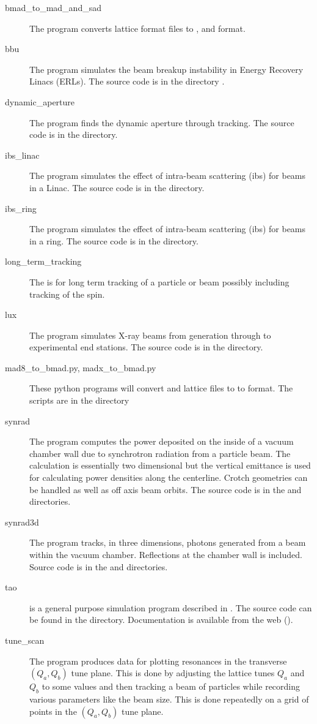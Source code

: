 \documentclass{hitec}     %
\begin{document}
  \begin{description}
%
  \item[bmad_to_mad_and_sad] \Newline
The  program converts \bmad lattice format files to ,  and
 format.
%
  \item[bbu] \Newline
The  program simulates the beam breakup instability in Energy Recovery Linacs (ERLs). The
source code is in the directory .
%
  \item[dynamic_aperture] \Newline
The  program finds the dynamic aperture through tracking. The source code is in
the  directory.
%
  \item[ibs_linac] \Newline
The  program simulates the effect of intra-beam scattering (ibs) for beams
in a Linac. The source code is in the  directory.
%
  \item[ibs_ring] \Newline
The  program simulates the effect of intra-beam scattering (ibs) for beams
in a ring. The source code is in the  directory.
%
  \item[long_term_tracking] \Newline
The  is for long term tracking of a particle or beam possibly
including tracking of the spin.
%
  \item[lux] \Newline
The  program simulates X-ray beams from generation through to experimental end stations.
The source code is in the  directory.
%
  \item[mad8_to_bmad.py, madx_to_bmad.py] \Newline
These python programs will convert  and  lattice files to to \bmad format. The
scripts are in the  directory
%
  \item[synrad] \Newline
The  program computes the power deposited on the inside of a vacuum chamber
wall due to synchrotron radiation from a particle beam. The calculation is essentially two
dimensional but the vertical emittance is used for calculating power densities along the
centerline. Crotch geometries can be handled as well as off axis beam orbits. The source code 
is in the  and  directories. 
%
  \item[synrad3d] \Newline
The  program tracks, in three dimensions, photons generated from a beam
within the vacuum chamber. Reflections at the chamber wall is included. Source code is
in the  and  directories.
%
  \item[tao] \Newline
\tao is a general purpose simulation program described in . The source code can be
found in the  directory. Documentation is available from the web ().
%
  \item[tune_scan] \Newline
The  program produces data for plotting resonances in the transverse $(Q_a, Q_b)$ tune
plane.  This is done by adjusting the lattice tunes $Q_a$ and $Q_b$ to some values and then tracking
a beam of particles while recording various parameters like the beam size. This is done repeatedly
on a grid of points in the $(Q_a, Q_b)$ tune plane.
  \end{description}
\end{document}
